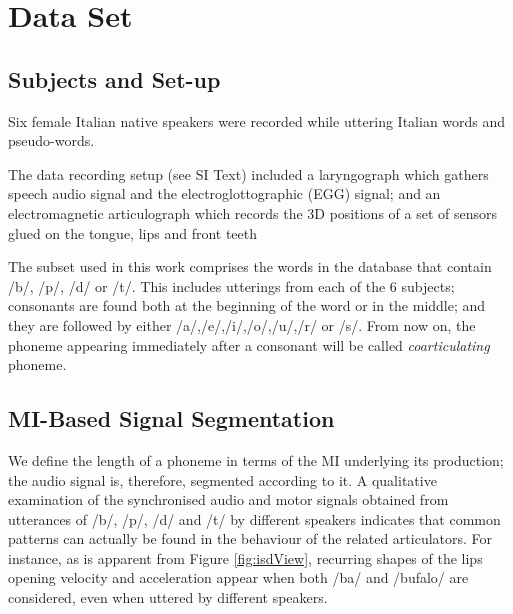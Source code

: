 \section{Data Set}
\label{sec:dataset}

\subsection{Subjects and Set-up}
\label{subsec:setup}

Six female Italian native speakers were recorded while uttering
Italian words and pseudo-words.

The data recording setup (see SI Text) included a laryngograph which
gathers speech audio signal and the electroglottographic (EGG) 
signal; and an electromagnetic articulograph which records the
3D positions of a set of sensors glued on the tongue, lips and front teeth

The subset used in this work comprises the words in the database
that contain /b/, /p/, /d/ or /t/. This includes utterings from each of the
$6$ subjects; consonants are found both at the beginning of the word or
in the middle; and they are followed by either /a/,/e/,/i/,/o/,/u/,/r/ or /s/.
From now on, the phoneme appearing immediately after a consonant will be called
\emph{coarticulating} phoneme.

\subsection{MI-Based Signal Segmentation}
\label{subsec:segm}

We define the length of a phoneme in terms of the MI underlying its production;
the audio signal is, therefore, segmented according to it.
A qualitative examination of the synchronised audio and motor
signals obtained from utterances of /b/, /p/, /d/ and /t/
by different speakers indicates that common patterns can
actually be found in the behaviour of the related articulators.
For instance, as is apparent from Figure \ref{fig:isdView}, 
recurring shapes of the lips opening velocity and acceleration appear
when both /ba/ and /bufalo/ are considered, even when uttered by different
speakers. 

